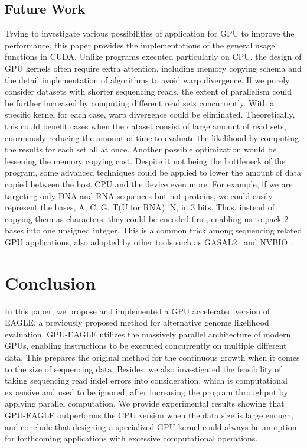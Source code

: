 \documentclass{PHlab-thesis}
\begin{document}
\section{Future Work}
Trying to investigate various possibilities of application for GPU to improve the performance, this paper provides the implementations of the general usage functions in CUDA. Unlike programs executed particularly on CPU, the design of GPU kernels often require extra attention, including memory copying schema and the detail implementation of algorithms to avoid warp divergence. If we purely consider datasets with shorter sequencing reads, the extent of parallelism could be further increased by computing different read sets concurrently. With a specific kernel for each case, warp divergence could be eliminated. Theoretically, this could benefit cases when the dataset consist of large amount of read sets, enormously reducing the amount of time to evaluate the likelihood by computing the results for each set all at once. Another possible optimization would be lessening the memory copying cost. Despite it not being the bottleneck of the program, some advanced techniques could be applied to lower the amount of data copied between the host CPU and the device even more. For example, if we are targeting only DNA and RNA sequences but not proteins, we could easily represent the bases, A, C, G, T(U for RNA), N, in 3 bits. Thus, instead of copying them as characters, they could be encoded first, enabling us to pack 2 bases into one unsigned integer. This is a common trick among sequencing related GPU applications, also adopted by other tools such as GASAL2~\cite{ahmed2019gasal2} and NVBIO~\cite{nvbio2015}.

\chapter{Conclusion}
In this paper, we propose and implemented a GPU accelerated version of EAGLE, a previously proposed method for alternative genome likelihood evaluation. GPU-EAGLE utilizes the massively parallel architecture of modern GPUs, enabling instructions to be executed concurrently on multiple different data. This prepares the original method for the continuous growth when it comes to the size of sequencing data. Besides, we also investigated the feasibility of taking sequencing read indel errors into consideration, which is computational expensive and used to be ignored, after increasing the program throughput by applying parallel computation. We provide experimental results showing that GPU-EAGLE outperforms the CPU version when the data size is large enough, and conclude that designing a specialized GPU kernel could always be an option for forthcoming applications with excessive computational operations.

\newpage
{}
\printbibliography
\end{document}
